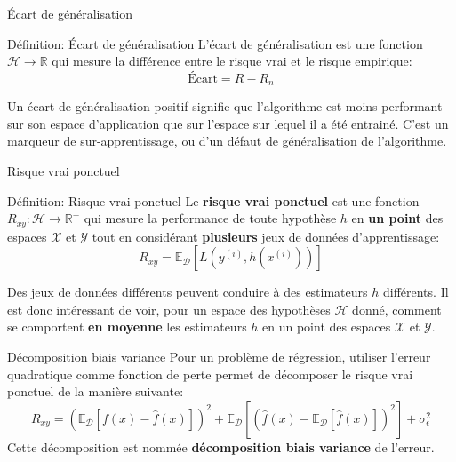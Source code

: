 \begin{frame}{Écart de généralisation}
	\begin{block}{Définition: Écart de généralisation}
		L'écart de généralisation est une fonction $\mathcal{H} \to \mathbb{R}$ qui mesure la différence entre le risque vrai et le risque empirique:
		\begin{equation}
			\text{Écart} = R - R_n
			\nonumber
		\end{equation}
		\hfill
	\end{block}
	\pause
	Un écart de généralisation positif signifie que l'algorithme est moins performant sur son espace d'application que sur l'espace sur lequel il a été entrainé. C'est un marqueur de sur-apprentissage, ou d'un défaut de généralisation de l'algorithme.
\end{frame}

\begin{frame}{Risque vrai ponctuel}
	\begin{block}{Définition: Risque vrai ponctuel}
		Le \textbf{risque vrai ponctuel} est une fonction $R_{xy}: \mathcal{H} \to \mathbb{R}^+$ qui mesure la performance de toute hypothèse $h$ en \textbf{un point} des espaces $\mathcal{X}$ et $\mathcal{Y}$ tout en considérant \textbf{plusieurs} jeux de données d'apprentissage:
		\begin{equation}
			R_{xy} = \mathbb{E}_{\mathcal{D}}\left[L\left(y^{(i)}, h\left(x^{(i)}\right)\right)\right]
			\nonumber
		\end{equation}
		\hfill
	\end{block}
	\vspace{0.5cm}
	\pause
	Des jeux de données différents peuvent conduire à des estimateurs $h$ différents. Il est donc intéressant de voir, pour un espace des hypothèses $\mathcal{H}$ donné, comment se comportent \textbf{en moyenne} les estimateurs $h$ en un point des espaces $\mathcal{X}$ et $\mathcal{Y}$.
\end{frame}

\begin{frame}{Décomposition biais variance}
	Pour un problème de régression, utiliser l'erreur quadratique comme fonction de perte permet de décomposer le risque vrai ponctuel de la manière suivante:
	\begin{equation}
		R_{xy} = \left(\mathbb{E}_{\mathcal{D}}\left[f(x) - \hat{f}(x)\right]\right)^2 + \mathbb{E}_{\mathcal{D}}\left[\left(\hat{f}(x) - \mathbb{E}_{\mathcal{D}}\left[\hat{f}(x)\right]\right)^2\right] + \sigma_{\epsilon}^2
		\nonumber
	\end{equation}
	Cette décomposition est nommée \textbf{décomposition biais variance} de l'erreur.
\end{frame}

